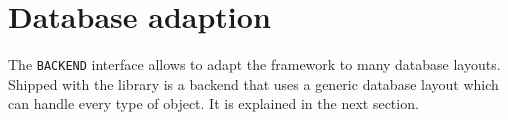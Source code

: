 \documentclass[a4paper,12pt]{report}
\begin{document}
% 
% 
% 
% 


\chapter{Database adaption}

The \lstinline!BACKEND! interface allows to adapt the framework to many database layouts.
Shipped with the library is a backend that uses a generic database layout which can handle every type of object.
It is explained in the next section.

\end{document}
